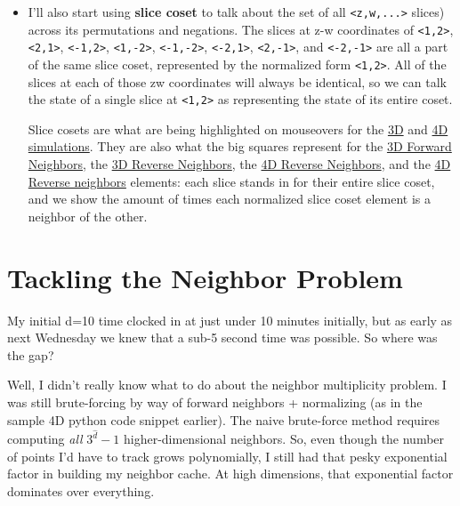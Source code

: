 \documentclass[]{article}
\begin{document}
\begin{itemize}
\item
  I'll also start using \textbf{slice coset} to talk about the set of all
  \texttt{\textless{}z,w,...\textgreater{}} slices) across its permutations and
  negations. The slices at z-w coordinates of
  \texttt{\textless{}1,2\textgreater{}}, \texttt{\textless{}2,1\textgreater{}},
  \texttt{\textless{}-1,2\textgreater{}},
  \texttt{\textless{}1,-2\textgreater{}},
  \texttt{\textless{}-1,-2\textgreater{}},
  \texttt{\textless{}-2,1\textgreater{}},
  \texttt{\textless{}2,-1\textgreater{}}, and
  \texttt{\textless{}-2,-1\textgreater{}} are all a part of the same slice
  coset, represented by the normalized form
  \texttt{\textless{}1,2\textgreater{}}. All of the slices at each of those zw
  coordinates will always be identical, so we can talk the state of a single
  slice at \texttt{\textless{}1,2\textgreater{}} as representing the state of
  its entire coset.

  Slice cosets are what are being highlighted on mouseovers for the
  \protect\hyperlink{gol3D}{3D} and \protect\hyperlink{gol4D}{4D simulations}.
  They are also what the big squares represent for the
  \protect\hyperlink{golSyms3DForward}{3D Forward Neighbors}, the
  \protect\hyperlink{golSyms3DReverse}{3D Reverse Neighbors}, the
  \protect\hyperlink{golSyms4DForward}{4D Reverse Neighbors}, and the
  \protect\hyperlink{golSyms4DReverse}{4D Reverse neighbors} elements: each
  slice stands in for their entire slice coset, and we show the amount of times
  each normalized slice coset element is a neighbor of the other.
\end{itemize}

\hypertarget{tackling-the-neighbor-problem}{%
\section{Tackling the Neighbor Problem}\label{tackling-the-neighbor-problem}}

My initial d=10 time clocked in at just under 10 minutes initially, but as early
as next Wednesday we knew that a sub-5 second time was possible. So where was
the gap?

Well, I didn't really know what to do about the neighbor multiplicity problem. I
was still brute-forcing by way of forward neighbors + normalizing (as in the
sample 4D python code snippet earlier). The naive brute-force method requires
computing \emph{all} \(3^{ {\hat{d}} } - 1\) higher-dimensional neighbors. So,
even though the number of points I'd have to track grows polynomially, I still
had that pesky exponential factor in building my neighbor cache. At high
dimensions, that exponential factor dominates over everything.
\end{document}

